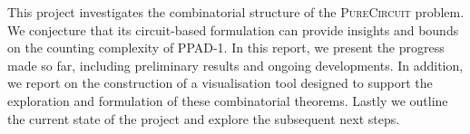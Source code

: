 This project investigates the combinatorial structure of the \textsc{PureCircuit} problem.
We conjecture that its circuit-based formulation can provide insights and bounds on the counting complexity of \textsc{PPAD-1}.
In this report, we present the progress made so far, including preliminary results and ongoing developments.
In addition, we report on the construction of a visualisation tool designed to support the exploration and formulation of these combinatorial theorems.
Lastly we outline the current state of the project and explore the subsequent next steps.

